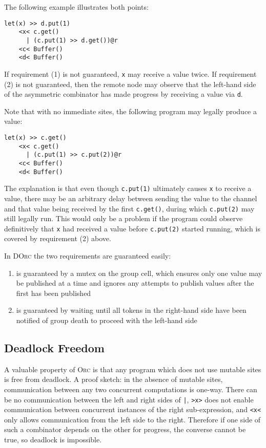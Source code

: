 \documentclass[10pt,letterpaper]{article}
\begin{document}
The following example illustrates both points:
\begin{verbatim}
let(x) >> d.put(1)
    <x< c.get()
      | (c.put(1) >> d.get())@r
    <c< Buffer()
    <d< Buffer()
\end{verbatim}
If requirement (1) is not guaranteed, \texttt{x} may receive a value twice. If
requirement (2) is not guaranteed, then the remote node may observe that the
left-hand side of the asymmetric combinator has made progress by receiving a
value via \texttt{d}.

Note that with no immediate sites, the following program may legally produce a
value:
\begin{verbatim}
let(x) >> c.get()
    <x< c.get()
      | (c.put(1) >> c.put(2))@r
    <c< Buffer()
    <d< Buffer()
\end{verbatim}
The explanation is that even though \texttt{c.put(1)} ultimately causes
\texttt{x} to receive a value, there may be an arbitrary delay between sending
the value to the channel and that value being received by the first
\texttt{c.get()}, during which \texttt{c.put(2)} may still legally run. This
would only be a problem if the program could observe definitively that
\texttt{x} had received a value before \texttt{c.put(2)} started running, which
is covered by requirement (2) above.

In \textsc{DOrc} the two requirements are guaranteed easily:
\begin{enumerate}
\item is guaranteed by a mutex on the group cell, which ensures only one value
may be published at a time and ignores any attempts to publish values after the
first has been published
\item is guaranteed by waiting until all tokens in the right-hand side have
been notified of group death to proceed with the left-hand side
\end{enumerate}

\subsection{Deadlock Freedom}

A valuable property of \textsc{Orc} is that any program which does not use
mutable sites is free from deadlock. A proof sketch: in the absence of mutable
sites, communication between any two concurrent computations is one-way. There
can be no communication between the left and right sides of \texttt{|},
\texttt{>x>} does not enable communication between concurrent instances of the
right sub-expression, and \texttt{<x<} only allows communication from the left
side to the right. Therefore if one side of such a combinator depends on the
other for progress, the converse cannot be true, so deadlock is impossible.
\end{document}

